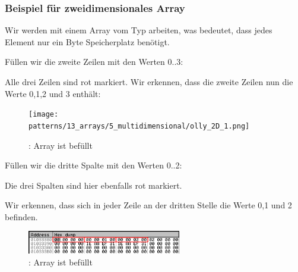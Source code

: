 \subsubsection{Beispiel für zweidimensionales Array}
Wir werden mit einem Array vom Typ \Tchar arbeiten, was bedeutet, dass jedes Element nur ein Byte Speicherplatz
benötigt.


\myindex{\olly}
Füllen wir die zweite Zeilen mit den Werten 0..3:


Alle drei Zeilen sind rot markiert.
Wir erkennen, dass die zweite Zeilen nun die Werte 0,1,2 und 3 enthält:

\begin{figure}[H]
\centering
\texttt{[image: patterns/13\_arrays/5\_multidimensional/olly\_2D\_1.png]}
\caption{\olly: Array ist befüllt}
\end{figure}

\myindex{\olly}
Füllen wir die dritte Spalte mit den Werten 0..2:



Die drei Spalten sind hier ebenfalls rot markiert.

Wir erkennen, dass sich in jeder Zeile an der dritten Stelle die Werte 0,1 und 2 befinden. 

\begin{figure}[H]
\centering
\includegraphics[width=0.6\textwidth]{patterns/13_arrays/5_multidimensional/olly_2D_2.png}
\caption{\olly: Array ist befüllt}
\end{figure}

